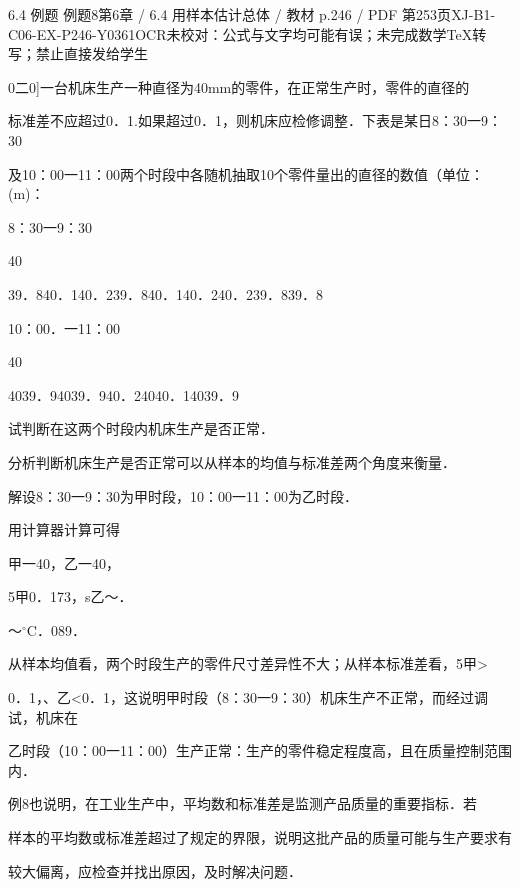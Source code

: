 \begin{bankitem}{6.4 例题 例题8}{第6章 / 6.4 用样本估计总体 / 教材 p.246 / PDF 第253页}{XJ-B1-C06-EX-P246-Y0361}{OCR未校对：公式与文字均可能有误；未完成数学TeX转写；禁止直接发给学生}
\begin{ocrdraft}
\par
0二0]一台机床生产一种直径为40mm的零件，在正常生产时，零件的直径的
\par
标准差不应超过0．1.如果超过0．1，则机床应检修调整．下表是某日8：30一9：30
\par
及10：00一11：00两个时段中各随机抽取10个零件量出的直径的数值（单位：(m)：
\par
8：30一9：30
\par
40
\par
39．840．140．239．840．140．240．239．839．8
\par
10：00．一11：00
\par
40
\par
4039．94039．940．24040．14039．9
\par
试判断在这两个时段内机床生产是否正常．
\par
分析判断机床生产是否正常可以从样本的均值与标准差两个角度来衡量．
\par
解设8：30一9：30为甲时段，10：00一11：00为乙时段．
\par
用计算器计算可得
\par
甲一40，乙一40，
\par
5甲0．173，s乙～．
\par
～\ensuremath{{}^\circ\mathrm C}．089．
\par
从样本均值看，两个时段生产的零件尺寸差异性不大；从样本标准差看，5甲>
\par
0．1，、乙<0．1，这说明甲时段（8：30一9：30）机床生产不正常，而经过调试，机床在
\par
乙时段（10：00一11：00）生产正常：生产的零件稳定程度高，且在质量控制范围内．
\par
例8也说明，在工业生产中，平均数和标准差是监测产品质量的重要指标．若
\par
样本的平均数或标准差超过了规定的界限，说明这批产品的质量可能与生产要求有
\par
较大偏离，应检查并找出原因，及时解决问题．

\end{ocrdraft}
\end{bankitem}
